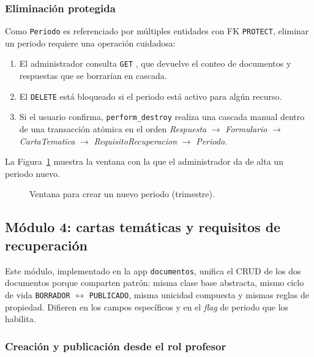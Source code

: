 \subsubsection{Eliminación protegida}

Como \texttt{Periodo} es referenciado por múltiples entidades con FK \texttt{PROTECT}, eliminar un periodo requiere una operación cuidadosa:

\begin{enumerate}
    \item El administrador consulta \texttt{GET} , que devuelve el conteo de documentos y respuestas que se borrarían en cascada.
    \item El \texttt{DELETE} está bloqueado si el periodo está activo para algún recurso.
    \item Si el usuario confirma, \texttt{perform\_destroy} realiza una cascada manual dentro de una transacción atómica en el orden \emph{Respuesta} $\rightarrow$ \emph{Formulario} $\rightarrow$ \emph{CartaTematica} $\rightarrow$ \emph{RequisitoRecuperacion} $\rightarrow$ \emph{Periodo}.
\end{enumerate}

La Figura~\ref{fig:admin_periodos} muestra la ventana con la que el administrador da de alta un periodo nuevo.

\begin{figure}[!htbp]
    \centering
    \caption{Ventana para crear un nuevo periodo (trimestre).}
    \label{fig:admin_periodos}
\end{figure}

\subsection{Módulo 4: cartas temáticas y requisitos de recuperación}

Este módulo, implementado en la app \texttt{documentos}, unifica el CRUD de los dos documentos porque comparten patrón: misma clase base abstracta, mismo ciclo de vida \texttt{BORRADOR} $\leftrightarrow$ \texttt{PUBLICADO}, misma unicidad compuesta y mismas reglas de propiedad. Difieren en los campos específicos y en el \emph{flag} de periodo que los habilita.

\subsubsection{Creación y publicación desde el rol profesor}

